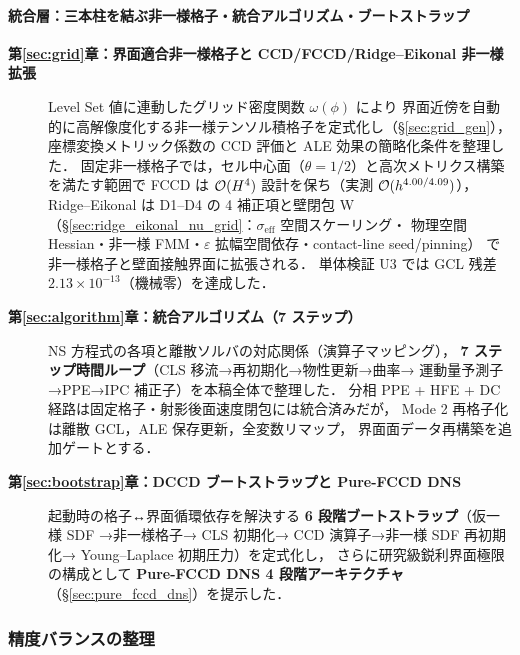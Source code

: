 \paragraph{統合層：三本柱を結ぶ非一様格子・統合アルゴリズム・ブートストラップ}\hfill\null

\begin{description}
  \item[\textbf{第\ref{sec:grid}章：界面適合非一様格子と CCD/FCCD/Ridge--Eikonal 非一様拡張}]
        Level Set 値に連動したグリッド密度関数 $\omega(\phi)$ により
        界面近傍を自動的に高解像度化する非一様テンソル積格子を定式化し（§\ref{sec:grid_gen}），
        座標変換メトリック係数の CCD 評価と ALE 効果の簡略化条件を整理した．
        固定非一様格子では，セル中心面（$\theta=1/2$）と高次メトリクス構築を満たす範囲で
        FCCD は $\mathcal{O}(H^4)$ 設計を保ち（実測 $\mathcal{O}(h^{4.00/4.09})$），
        Ridge--Eikonal は D1--D4 の 4 補正項と壁閉包 W
        （§\ref{sec:ridge_eikonal_nu_grid}：$\sigma_{\mathrm{eff}}$ 空間スケーリング・
        物理空間 Hessian・非一様 FMM・$\varepsilon$ 拡幅空間依存・contact-line seed/pinning）
        で非一様格子と壁面接触界面に拡張される．
        単体検証 U3 では GCL 残差 $2.13\times10^{-13}$（機械零）を達成した．

  \item[\textbf{第\ref{sec:algorithm}章：統合アルゴリズム（7 ステップ）}]
        NS 方程式の各項と離散ソルバの対応関係（演算子マッピング），
        \textbf{7 ステップ時間ループ}（CLS 移流→再初期化→物性更新→曲率→
        運動量予測子→PPE→IPC 補正子）を本稿全体で整理した．
        分相 PPE + HFE + DC 経路は固定格子・射影後面速度閉包には統合済みだが，
        Mode 2 再格子化は離散 GCL，ALE 保存更新，全変数リマップ，
        界面面データ再構築を追加ゲートとする．

  \item[\textbf{第\ref{sec:bootstrap}章：DCCD ブートストラップと Pure-FCCD DNS}]
        起動時の格子↔界面循環依存を解決する
        \textbf{6 段階ブートストラップ}（仮一様 SDF →非一様格子→ CLS 初期化→
        CCD 演算子→非一様 SDF 再初期化→ Young--Laplace 初期圧力）を定式化し，
        さらに研究級鋭利界面極限の構成として
        \textbf{Pure-FCCD DNS 4 段階アーキテクチャ}（§\ref{sec:pure_fccd_dns}）を提示した．
\end{description}

\subsubsection{精度バランスの整理}

